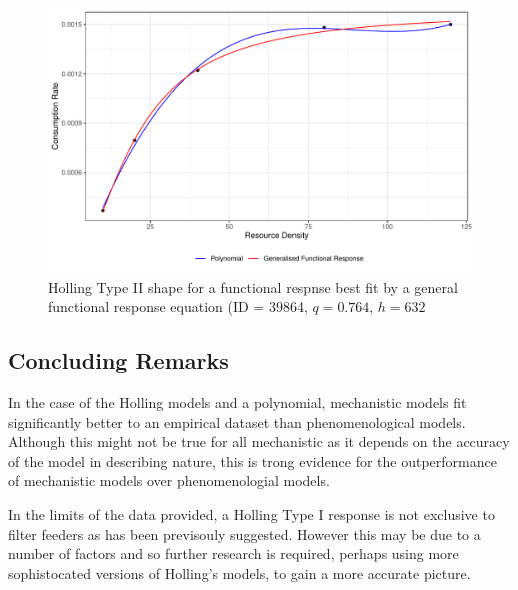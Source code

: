 \documentclass[11pt, a4paper, titlepage]{article}
\begin{document}
\begin{figure}[ht!]
	\centering\includegraphics[width=1\textwidth]{../Results/GFR_Holling2_example.pdf}
	\caption{Holling Type II shape for a functional respnse best fit by a general functional response equation (ID = 39864, $q = 0.764$, $h = 632$}
\end{figure}

\subsection{Concluding Remarks}

In the case of the Holling models and a polynomial, mechanistic models fit significantly better to an empirical dataset than phenomenological models. Although this might not be true for all mechanistic as it depends on the accuracy of the model in describing nature, this is trong evidence for the outperformance of mechanistic models over phenomenologial models.

In the limits of the data provided, a Holling Type I response is not exclusive to filter feeders as has been previsouly suggested. However this may be due to a number of factors and so further research is required, perhaps using more sophistocated versions of Holling's models, to gain a more accurate picture.


\newpage
\printbibliography
\end{document}

